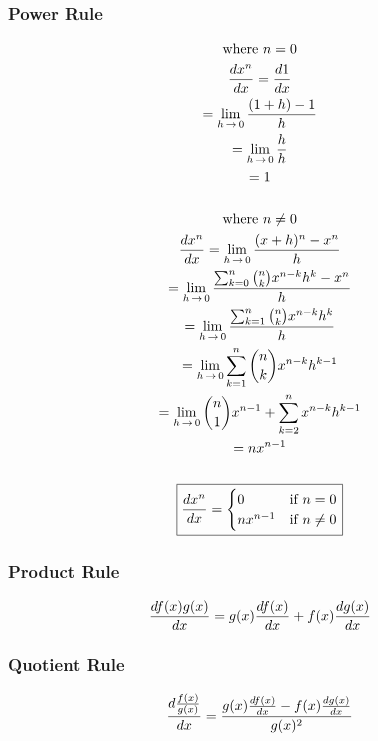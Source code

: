 \documentclass[12pt]{article}
\numberwithin{equation}{subsubsection}
\begin{document}
			\subsubsection{Power Rule}
				\begin{gather}
					\text{where } n = 0 \\
					\frac{d x^n}{d x} = \frac{d 1}{d x} \\
					= \lim_{h \,\to\, 0} \frac{(1 + h) - 1}{h} \\
					= \lim_{h \,\to\, 0} \frac{h}{h} \\
					= 1 \\ \nonumber
					\\
					\text{where } n \neq 0 \\
					\frac{d x^n}{d x} = \lim_{h \,\to\, 0} \frac{(x+h)^n - x^n}{h} \\
					= \lim_{h \,\to\, 0} \frac{\sum_{k=0}^n \binom{n}{k}
					x^{n-k}h^k - x^n}{h} \\
					= \lim_{h \,\to\, 0} \frac{\sum_{k=1}^n \binom{n}{k}
					x^{n-k}h^k}{h} \\
					= \lim_{h \,\to\, 0} \sum_{k=1}^n \binom{n}{k} x^{n-k}h^{k-1} \\
					= \lim_{h \,\to\, 0} \binom{n}{1} x^{n-1} + \sum_{k=2}^n
					x^{n-k}h^{k-1} \\
					= nx^{n-1} \\ \nonumber
					\\
					\boxed{
					\frac{d x^n}{d x} =
						\begin{cases}
							0 & \text{if } n = 0 \\
							nx^{n-1} & \text{if } n
							\neq 0
						\end{cases}
					}
				\end{gather}
			\subsubsection{Product Rule}
				\begin{gather}
					\frac{d f(x)g(x)}{d x} = g(x)\frac{d f(x)}{d x} +
					f(x)\frac{d g(x)}{d x}
				\end{gather}
			\subsubsection{Quotient Rule}
				\begin{gather}
					\frac{d \frac{f(x)}{g(x)}}{d x} =
					\frac{g(x)\frac{d f(x)}{d x} -
					f(x)\frac{d g(x)}{d x}}{g(x)^2}
				\end{gather}
\end{document}
